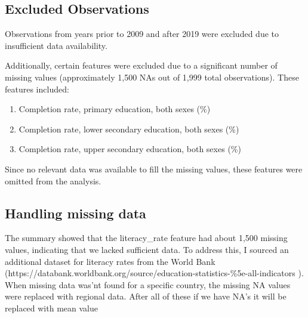 \documentclass[
  letterpaper,
  DIV=11,
  numbers=noendperiod]{scrartcl}
\newenvironment{Shaded}{\begin{snugshade}}{\end{snugshade}}
\newcommand{\AttributeTok}[1]{\textcolor[rgb]{0.40,0.45,0.13}{#1}}
\newcommand{\ConstantTok}[1]{\textcolor[rgb]{0.56,0.35,0.01}{#1}}
\newcommand{\FunctionTok}[1]{\textcolor[rgb]{0.28,0.35,0.67}{#1}}
\newcommand{\NormalTok}[1]{\textcolor[rgb]{0.00,0.23,0.31}{#1}}
\newcommand{\OtherTok}[1]{\textcolor[rgb]{0.00,0.23,0.31}{#1}}
\newcommand{\SpecialCharTok}[1]{\textcolor[rgb]{0.37,0.37,0.37}{#1}}
\begin{document}
\subsection{Excluded Observations}\label{excluded-observations}

Observations from years prior to 2009 and after 2019 were excluded due
to insufficient data availability.

Additionally, certain features were excluded due to a significant number
of missing values (approximately 1,500 NAs out of 1,999 total
observations). These features included:

\begin{enumerate}
\def\labelenumi{\arabic{enumi}.}
\item
  Completion rate, primary education, both sexes (\%)
\item
  Completion rate, lower secondary education, both sexes (\%)
\item
  Completion rate, upper secondary education, both sexes (\%)
\end{enumerate}

Since no relevant data was available to fill the missing values, these
features were omitted from the analysis.

\subsection{Handling missing data}\label{handling-missing-data}

The summary showed that the literacy\_rate feature had about 1,500
missing values, indicating that we lacked sufficient data. To address
this, I sourced an additional dataset for literacy rates from the World
Bank
(https://databank.worldbank.org/source/education-statistics-\%5e-all-indicators
). When missing data was'nt found for a specific country, the missing NA
values were replaced with regional data. After all of these if we have
NA's it will be replaced with mean value

\begin{Shaded}
\end{Shaded}
\end{document}
